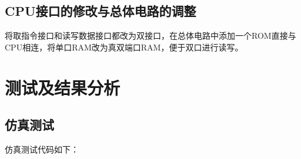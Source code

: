 \documentclass{article}
\begin{document}
        \subsection{CPU接口的修改与总体电路的调整}
        \par{}
        将取指令接口和读写数据接口都改为双接口，在总体电路中添加一个ROM直接与CPU相连，将单口RAM改为真双端口RAM，便于双口进行读写。

    \newpage{}
    \section{测试及结果分析}
        \subsection{仿真测试}
        \par{}
        仿真测试代码如下：
\end{document}
